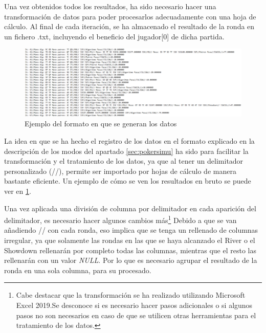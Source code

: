 Una vez obtenidos todos los resultados, ha sido necesario hacer una transformación de datos para poder procesarlos adecuadamente con una hoja de cálculo. Al final de cada iteración, se ha almacenado el resultado de la ronda en un fichero .txt, incluyendo el beneficio del jugador[0] de dicha partida.
\begin{figure}[h]
\centering
\includegraphics[width=1\textwidth]{figuras/resultados.png}   
\caption{Ejemplo del formato en que se generan los datos}
\label{fig:resultados}
\end{figure}

La idea en que se ha hecho el registro de los datos en el formato explicado en la descripción de los modos del apartado \ref{sec:pokersimu} ha sido para facilitar la transformación y el tratamiento de los datos, ya que al tener un delimitador personalizado (//), permite ser importado por hojas de cálculo de manera bastante eficiente. Un ejemplo de cómo se ven los resultados en bruto se puede ver en \ref{fig:resultados}.

Una vez aplicada una división de columna por delimitador en cada aparición del delimitador, es necesario hacer algunos cambios más\footnote{Cabe destacar que la transformación se ha realizado utilizando Microsoft Excel 2019.Se desconoce si es necesario hacer pasos adicionales o si algunos pasos no son necesarios en caso de que se utilicen otras herramientas para el tratamiento de los datos.}
Debido a que se van añadiendo // con cada ronda, eso implica que se tenga un rellenado de columnas irregular, ya que solamente las rondas en las que se haya alcanzado el River o el Showdown rellenarán por completo todas las columnas, mientras que el resto las rellenarán con un valor \textit{NULL}.  Por lo que es necesario agrupar el resultado de la ronda en una sola columna, para su procesado.

